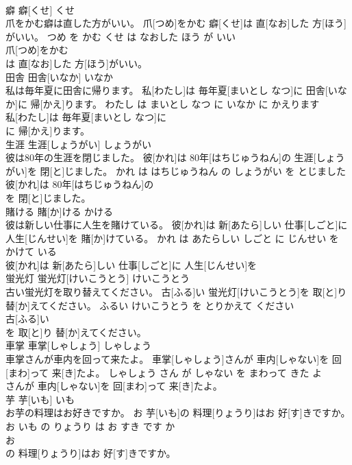 \documentclass[8pt]{extreport}
\begin{document}
\begin{CJK}{UTF8}{min}
\\	癖	癖[くせ]	くせ	
\\	爪をかむ癖は直した方がいい。	爪[つめ]をかむ 癖[くせ]は 直[なお]した 方[ほう]がいい。	つめ を かむ くせ は なおした ほう が いい	
\\	爪[つめ]をかむ
\\	は 直[なお]した 方[ほう]がいい。			
\\	田舎	田舎[いなか]	いなか	
\\	私は毎年夏に田舎に帰ります。	私[わたし]は 毎年夏[まいとし なつ]に 田舎[いなか]に 帰[かえ]ります。	わたし は まいとし なつ に いなか に かえります	
\\	私[わたし]は 毎年夏[まいとし なつ]に
\\	に 帰[かえ]ります。			
\\	生涯	生涯[しょうがい]	しょうがい	
\\	彼は80年の生涯を閉じました。	彼[かれ]は 80年[はちじゅうねん]の 生涯[しょうがい]を 閉[と]じました。	かれ は はちじゅうねん の しょうがい を とじました	
\\	彼[かれ]は 80年[はちじゅうねん]の
\\	を 閉[と]じました。			
\\	賭ける	賭[か]ける	かける	
\\	彼は新しい仕事に人生を賭けている。	彼[かれ]は 新[あたら]しい 仕事[しごと]に 人生[じんせい]を 賭[か]けている。	かれ は あたらしい しごと に じんせい を かけて いる	
\\	彼[かれ]は 新[あたら]しい 仕事[しごと]に 人生[じんせい]を
\\	蛍光灯	蛍光灯[けいこうとう]	けいこうとう	
\\	古い蛍光灯を取り替えてください。	古[ふる]い 蛍光灯[けいこうとう]を 取[と]り 替[か]えてください。	ふるい けいこうとう を とりかえて ください	
\\	古[ふる]い
\\	を 取[と]り 替[か]えてください。			
\\	車掌	車掌[しゃしょう]	しゃしょう	
\\	車掌さんが車内を回って来たよ。	車掌[しゃしょう]さんが 車内[しゃない]を 回[まわ]って 来[き]たよ。	しゃしょう さん が しゃない を まわって きた よ	
\\	さんが 車内[しゃない]を 回[まわ]って 来[き]たよ。			
\\	芋	芋[いも]	いも	
\\	お芋の料理はお好きですか。	お 芋[いも]の 料理[りょうり]はお 好[す]きですか。	お いも の りょうり は お すき です か	
\\	お
\\	の 料理[りょうり]はお 好[す]きですか。			

\end{CJK}
\end{document}

